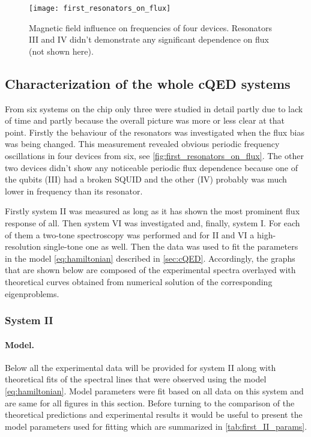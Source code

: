 \begin{figure}
\centering
\texttt{[image: first\_resonators\_on\_flux]}
\caption{Magnetic field influence on frequencies of four devices. Resonators III and IV didn't demonstrate any significant dependence on flux (not shown here).}
\label{fig:first_resonators_on_flux}
\end{figure} 

\subsection{Characterization of the whole cQED systems}

From six systems on the chip only three were studied in detail partly due to lack of time and partly because the overall picture was more or less clear at that point. Firstly the behaviour of the resonators was investigated when the flux bias was being changed. This measurement revealed obvious periodic frequency oscillations in four devices from six, see \autoref{fig:first_resonators_on_flux}. The other two devices didn't show any noticeable periodic flux dependence because one of the qubits (III) had a broken SQUID and the other (IV) probably was much lower in frequency than its resonator.

Firstly system II was measured as long as it has shown the most prominent flux response of all. Then system VI was investigated and, finally, system I. For each of them a two-tone spectroscopy was performed and for II and VI a high-resolution single-tone one as well. Then the data was used to fit the parameters in the model \eqref{eq:hamiltonian} described in \autoref{sec:cQED}. Accordingly, the graphs that are shown below are composed of the experimental spectra overlayed with theoretical curves obtained from numerical solution of the corresponding eigenproblems.

\subsubsection{System II}

\paragraph{Model.} Below all the experimental data will be provided for system II along with theoretical fits of the spectral lines that were observed using the model \eqref{eq:hamiltonian}. Model parameters were fit based on all data on this system and are same for all figures in this section. Before turning to the comparison of the theoretical predictions and experimental results it would be useful to present the model parameters used for fitting which are summarized in \autoref{tab:first_II_params}.


